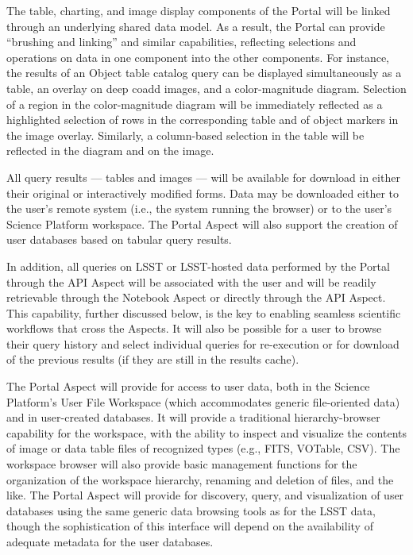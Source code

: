 The table, charting, and image display components of the Portal will be linked through an underlying shared data model.
As a result, the Portal can provide ``brushing and linking'' and similar capabilities, reflecting selections and operations on data in one component into the other components.
For instance, the results of an Object table catalog query can be displayed simultaneously as a table, an overlay on deep coadd images, and a color-magnitude diagram.
Selection of a region in the color-magnitude diagram will be immediately reflected as a highlighted selection of rows in the corresponding table and of object markers in the image overlay.
Similarly, a column-based selection in the table will be reflected in the diagram and on the image.

All query results --- tables and images --- will be available for download in either their original or interactively modified forms.
Data may be downloaded either to the user's remote system (i.e., the system running the browser) or to the user's Science Platform workspace.
The Portal Aspect will also support the creation of user databases based on tabular query results.

In addition, all queries on LSST or LSST-hosted data performed by the Portal through the API Aspect will be associated with the user and will be readily retrievable through the Notebook Aspect or directly through the API Aspect.
This capability, further discussed below, is the key to enabling seamless scientific workflows that cross the Aspects.
It will also be possible for a user to browse their query history and select individual queries for re-execution or for download of the previous results (if they are still in the results cache).

The Portal Aspect will provide for access to user data, both in the Science Platform's User File Workspace (which accommodates generic file-oriented data) and in user-created databases.
It will provide a traditional hierarchy-browser capability for the workspace, with the ability to inspect and visualize the contents of image or data table files of recognized types (e.g., FITS, VOTable, CSV).
The workspace browser will also provide basic management functions for the organization of the workspace hierarchy, renaming and deletion of files, and the like.
The Portal Aspect will provide for discovery, query, and visualization of user databases using the same generic data browsing tools as for the LSST data, though the sophistication of this interface will depend on the availability of adequate metadata for the user databases.

